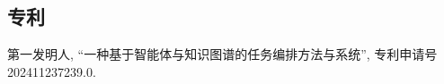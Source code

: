 
\begin{achievements}

\subsection*{专利}

\begin{bibliolist}{00}
  \item 第一发明人, “一种基于智能体与知识图谱的任务编排方法与系统”, 专利申请号202411237239.0.
\end{bibliolist}

\end{achievements}
